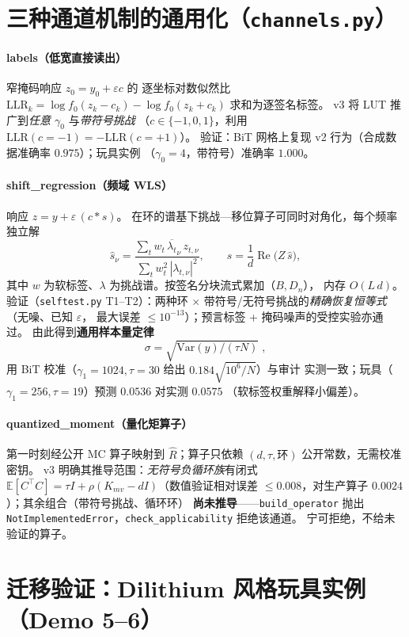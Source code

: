 \documentclass[11pt,a4paper]{ctexart}
\begin{document}
\section{三种通道机制的通用化（\texttt{channels.py}）}

\paragraph{labels（低宽直接读出）} 窄掩码响应 $z_0=y_0+\varepsilon c$ 的
逐坐标对数似然比
$\mathrm{LLR}_k=\log f_0(z_k-c_k)-\log f_0(z_k+c_k)$ 求和为逐签名标签。
v3 将 LUT 推广到\emph{任意 $\gamma_0$} 与\emph{带符号挑战}
（$c\in\{-1,0,1\}$，利用 $\mathrm{LLR}(c{=}-1)=-\mathrm{LLR}(c{=}{+}1)$）。
验证：BiT 网格上复现 v2 行为（合成数据准确率 $0.975$）；玩具实例
（$\gamma_0=4$，带符号）准确率 $1.000$。

\paragraph{shift\_regression（频域 WLS）} 响应 $z=y+\varepsilon\,(c*s)$。
在环的谱基下挑战—移位算子可同时对角化，每个频率独立解
\[
\hat s_\nu=\frac{\sum_t w_t\,\overline{\lambda_t}_\nu\,z_{t,\nu}}
               {\sum_t w_t^2\,|\lambda_{t,\nu}|^2},
\qquad
s=\frac{1}{d}\operatorname{Re}\!\Big(Z\,\hat s\Big),
\]
其中 $w$ 为软标签、$\lambda$ 为挑战谱。按签名分块流式累加（$B,D_n$），
内存 $O(L\,d)$。验证（\texttt{selftest.py} T1--T2）：两种环 $\times$
带符号/无符号挑战的\emph{精确恢复恒等式}（无噪、已知 $\varepsilon$，
最大误差 $\le10^{-13}$）；预言标签 + 掩码噪声的受控实验亦通过。
由此得到\textbf{通用样本量定律}
\[
\sigma=\sqrt{\mathrm{Var}(y)/(\tau N)}\;,
\]
用 BiT 校准（$\gamma_1=1024,\tau=30$ 给出 $0.184\sqrt{10^6/N}$）与审计
实测一致；玩具（$\gamma_1=256,\tau=19$）预测 $0.0536$ 对实测 $0.0575$
（软标签权重解释小偏差）。

\paragraph{quantized\_moment（量化矩算子）} 第一时刻经公开 MC 算子映射到
$\hat R$；算子只依赖 $(d,\tau,\text{环})$ 公开常数，无需校准密钥。
v3 明确其推导范围：\emph{无符号负循环族}有闭式
$\mathbb{E}[C^\top C]=\tau I+\rho(K_{mv}-dI)$（数值验证相对误差
$\le0.008$，对生产算子 $0.0024$）；其余组合（带符号挑战、循环环）
\textbf{尚未推导}——\texttt{build\_operator} 抛出
\texttt{NotImplementedError}，\texttt{check\_applicability} 拒绝该通道。
宁可拒绝，不给未验证的算子。

\section{迁移验证：Dilithium 风格玩具实例（Demo 5--6）}
\end{document}
